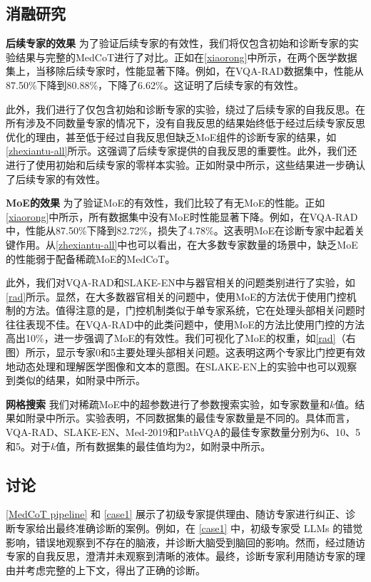\documentclass[11pt]{article}
\begin{document}
\subsection{消融研究}
\label{ablation}
\noindent\textbf{后续专家的效果}
为了验证后续专家的有效性，我们将仅包含初始和诊断专家的实验结果与完整的MedCoT进行了对比。正如在\autoref{xiaorong}中所示，在两个医学数据集上，当移除后续专家时，性能显著下降。例如，在VQA-RAD数据集中，性能从87.50\%下降到80.88\%，下降了6.62\%。这证明了后续专家的有效性。

此外，我们进行了仅包含初始和诊断专家的实验，绕过了后续专家的自我反思。在所有涉及不同数量专家的情况下，没有自我反思的结果始终低于经过后续专家反思优化的理由，甚至低于经过自我反思但缺乏MoE组件的诊断专家的结果，如\autoref{zhexiantu-all}所示。这强调了后续专家提供的自我反思的重要性。此外，我们还进行了使用初始和后续专家的零样本实验。正如附录中所示，这些结果进一步确认了后续专家的有效性。

\noindent\textbf{MoE的效果}
为了验证MoE的有效性，我们比较了有无MoE的性能。正如\autoref{xiaorong}中所示，所有数据集中没有MoE时性能显著下降。例如，在VQA-RAD中，性能从87.50\%下降到82.72\%，损失了4.78\%。这表明MoE在诊断专家中起着关键作用。从\autoref{zhexiantu-all}中也可以看出，在大多数专家数量的场景中，缺乏MoE的性能弱于配备稀疏MoE的MedCoT。

此外，我们对VQA-RAD和SLAKE-EN中与器官相关的问题类别进行了实验，如\autoref{rad}所示。显然，在大多数器官相关的问题中，使用MoE的方法优于使用门控机制的方法。值得注意的是，门控机制类似于单专家系统，它在处理头部相关问题时往往表现不佳。在VQA-RAD中的此类问题中，使用MoE的方法比使用门控的方法高出10\%，进一步强调了MoE的有效性。我们可视化了MoE的权重，如\autoref{rad}（右图）所示，显示专家0和5主要处理头部相关问题。这表明这两个专家比门控更有效地动态处理和理解医学图像和文本的意图。在SLAKE-EN上的实验中也可以观察到类似的结果，如附录中所示。

\noindent\textbf{网格搜索}
我们对稀疏MoE中的超参数进行了参数搜索实验，如专家数量和\( k \)值。结果如附录中所示。实验表明，不同数据集的最佳专家数量是不同的。具体而言，VQA-RAD、SLAKE-EN、Med-2019和PathVQA的最佳专家数量分别为6、10、5和5。对于\( k \)值，所有数据集的最佳值均为2，如附录中所示。
\subsection{讨论}

\autoref{MedCoT pipeline} 和 \autoref{case1} 展示了初级专家提供理由、随访专家进行纠正、诊断专家给出最终准确诊断的案例。例如，在 \autoref{case1} 中，初级专家受 LLMs 的错觉影响，错误地观察到不存在的脑液，并诊断大脑受到脑回的影响。然而，经过随访专家的自我反思，澄清并未观察到清晰的液体。最终，诊断专家利用随访专家的理由并考虑完整的上下文，得出了正确的诊断。
\end{document}
